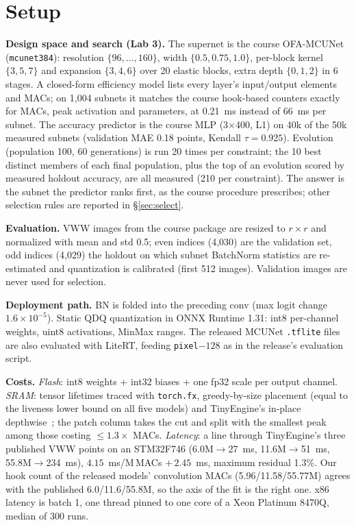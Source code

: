 \documentclass[10pt,letterpaper]{article}
\begin{document}
\section{Setup}
\textbf{Design space and search (Lab 3).} The supernet is the course OFA-MCUNet (\texttt{mcunet384}): resolution $\{96,\dots,160\}$, width $\{0.5,0.75,1.0\}$, per-block kernel $\{3,5,7\}$ and expansion $\{3,4,6\}$ over 20 elastic blocks, extra depth $\{0,1,2\}$ in 6 stages.
A closed-form efficiency model lists every layer's input/output elements and MACs; on 1,004 subnets it matches the course hook-based counters exactly for MACs, peak activation and parameters, at 0.21~ms instead of 66~ms per subnet.
The accuracy predictor is the course MLP (3$\times$400, L1) on 40k of the 50k measured subnets (validation MAE 0.18 points, Kendall $\tau=0.925$).
Evolution (population 100, 60 generations) is run 20 times per constraint; the 10 best distinct members of each final population, plus the top of an evolution scored by measured holdout accuracy, are all measured (210 per constraint).
The answer is the subnet the predictor ranks first, as the course procedure prescribes; other selection rules are reported in \S\ref{sec:select}.

\textbf{Evaluation.} VWW images from the course package are resized to $r\times r$ and normalized with mean and std 0.5; even indices (4,030) are the validation set, odd indices (4,029) the holdout on which subnet BatchNorm statistics are re-estimated and quantization is calibrated (first 512 images). Validation images are never used for selection.

\textbf{Deployment path.} BN is folded into the preceding conv (max logit change $1.6\times10^{-5}$). Static QDQ quantization in ONNX Runtime 1.31: int8 per-channel weights, uint8 activations, MinMax ranges. The released MCUNet \texttt{.tflite} files are also evaluated with LiteRT, feeding \texttt{pixel}$-128$ as in the release's evaluation script.

\textbf{Costs.} \emph{Flash}: int8 weights + int32 biases + one fp32 scale per output channel. \emph{SRAM}: tensor lifetimes traced with \texttt{torch.fx}, greedy-by-size placement (equal to the liveness lower bound on all five models) and TinyEngine's in-place depthwise~\cite{mcunet}; the patch column takes the cut and split with the smallest peak among those costing $\le 1.3\times$ MACs. \emph{Latency}: a line through TinyEngine's three published VWW points on an STM32F746 (6.0M$\to$27~ms, 11.6M$\to$51~ms, 55.8M$\to$234~ms), $4.15$~ms/M\,MACs $+\,2.45$~ms, maximum residual 1.3\%. Our hook count of the released models' convolution MACs (5.96/11.58/55.77M) agrees with the published 6.0/11.6/55.8M, so the axis of the fit is the right one. x86 latency is batch 1, one thread pinned to one core of a Xeon Platinum 8470Q, median of 300 runs.
\end{document}
